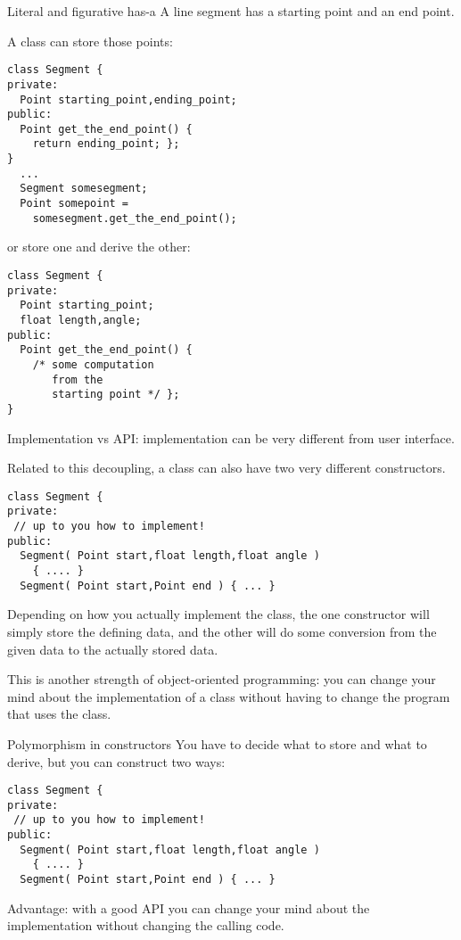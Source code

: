 \begin{slide}{Literal and figurative has-a}
  \label{sl:obj-hasa-ish}
\small
  A line segment has a starting point and an end point.
\begin{multicols}{2}
  A 
  class can store those points:
\begin{lstlisting}
class Segment {
private:
  Point starting_point,ending_point;
public:
  Point get_the_end_point() {
    return ending_point; };
}
  ...
  Segment somesegment;
  Point somepoint =
    somesegment.get_the_end_point();
\end{lstlisting}
\columnbreak
or store one and derive the other:
\begin{lstlisting}
class Segment {
private:
  Point starting_point;
  float length,angle;
public:
  Point get_the_end_point() {
    /* some computation
       from the
       starting point */ };
}
\end{lstlisting}
\vfill\hbox{}
\end{multicols}
Implementation vs API: implementation can be very different from user interface.
\end{slide}

Related to this decoupling, a class can also have two very different constructors.
\begin{lstlisting}
class Segment {
private:
 // up to you how to implement!
public:
  Segment( Point start,float length,float angle )
    { .... }
  Segment( Point start,Point end ) { ... }
\end{lstlisting}
Depending on how you actually implement the class, the one constructor
will simply store the defining data, and the other will do some
conversion from the given data to the actually stored data.

This is another strength of object-oriented programming: you can
change your mind about the implementation of a class without having
to change the program that uses the class.

\begin{slide}{Polymorphism in constructors}
  \label{sl:obj-poly-construct}
  You have to decide what to store and what to derive, but you can
  construct two ways:
\begin{lstlisting}
class Segment {
private:
 // up to you how to implement!
public:
  Segment( Point start,float length,float angle )
    { .... }
  Segment( Point start,Point end ) { ... }
\end{lstlisting}
Advantage: with a good API you can change your mind about the
implementation without changing the calling code.
\end{slide}

